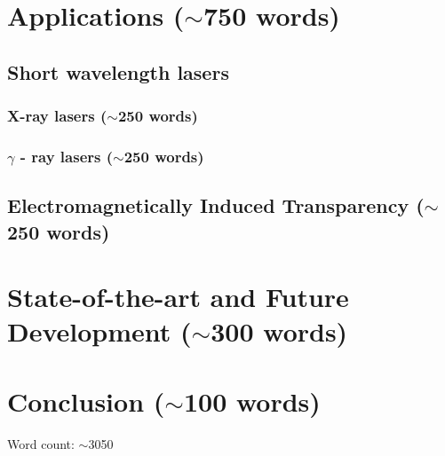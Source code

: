 \documentclass{article}
\begin{document}
\section{Applications ($\sim$750 words)}
\subsection{Short wavelength lasers}
\subsubsection{X-ray lasers ($\sim$250 words)}
\subsubsection{$\gamma$ - ray lasers ($\sim$250 words)}
\subsection{Electromagnetically Induced Transparency ($\sim$250 words)}

\section{State-of-the-art and Future Development ($\sim$300 words)}

\section{Conclusion ($\sim$100 words)}

Word count: $\sim$3050
\end{document}
